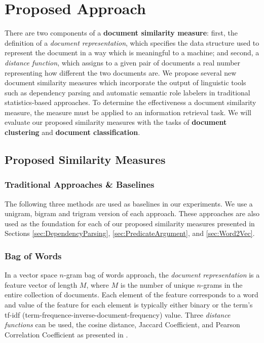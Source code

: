 \documentclass[11pt]{article}
\newcommand{\bt}[1]{\textbf{#1}}
\begin{document}
\section{Proposed Approach}

There are two components of a \bt{document similarity measure}: first, the definition of a \emph{document representation}, which specifies the data structure used to represent the document in a way which is meaningful to a machine; and second, a \emph{distance function}, which assigns to a given pair of documents a real number representing how different the two documents are. We propose several new document similarity measures which incorporate the output of linguistic tools such as dependency parsing and automatic semantic role labelers  in traditional statistics-based approaches. To determine the effectiveness a document similarity measure, the measure must be applied to an information retrieval task. We will evaluate our proposed similarity measures with the tasks of \bt{document clustering} and \bt{document classification}. 

\subsection{Proposed Similarity Measures}

\subsubsection{Traditional Approaches \& Baselines} \label{sec:TraditionalApproaches}

The following  three methods are used as baselines in our experiments. We use a unigram, bigram and trigram version of each approach. These approaches are also used as the foundation for each of our proposed similarity measures presented in Sections \ref{sec:DependencyParsing}, \ref{sec:PredicateArgument}, and \ref{sec:Word2Vec}.

\subsubsection*{Bag of Words}

In a vector space $n$-gram bag of words approach, the \emph{document representation} is a feature vector of length $M$, where $M$ is the number of unique $n$-grams in the entire collection of documents. Each element of the feature corresponds to a word and value of the feature for each element is typically either binary or the term's tf-idf (term-frequence-inverse-document-frequency) value. Three \emph{distance functions} can be used, the cosine distance, Jaccard Coefficient, and Pearson Correlation Coefficient as presented in \cite{Huang2008}.  
\end{document}
